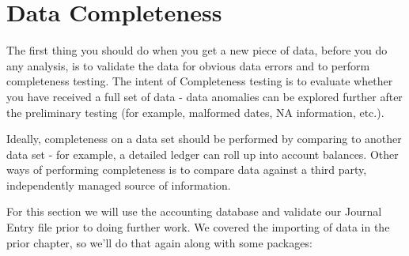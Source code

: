 \documentclass[
]{book}
\newenvironment{Shaded}{\begin{snugshade}}{\end{snugshade}}
\newcommand{\CommentTok}[1]{\textcolor[rgb]{0.56,0.35,0.01}{\textit{#1}}}
\newcommand{\DataTypeTok}[1]{\textcolor[rgb]{0.13,0.29,0.53}{#1}}
\newcommand{\KeywordTok}[1]{\textcolor[rgb]{0.13,0.29,0.53}{\textbf{#1}}}
\newcommand{\NormalTok}[1]{#1}
\newcommand{\OperatorTok}[1]{\textcolor[rgb]{0.81,0.36,0.00}{\textbf{#1}}}
\newcommand{\OtherTok}[1]{\textcolor[rgb]{0.56,0.35,0.01}{#1}}
\newcommand{\StringTok}[1]{\textcolor[rgb]{0.31,0.60,0.02}{#1}}
\begin{document}
\hypertarget{data-completeness}{%
\chapter{Data Completeness}\label{data-completeness}}

The first thing you should do when you get a new piece of data, before you do any analysis, is to validate the data for obvious data errors and to perform completeness testing. The intent of Completeness testing is to evaluate whether you have received a full set of data - data anomalies can be explored further after the preliminary testing (for example, malformed dates, NA information, etc.).

Ideally, completeness on a data set should be performed by comparing to another data set - for example, a detailed ledger can roll up into account balances. Other ways of performing completeness is to compare data against a third party, independently managed source of information.

For this section we will use the accounting database and validate our Journal Entry file prior to doing further work. We covered the importing of data in the prior chapter, so we'll do that again along with some packages:

\begin{Shaded}
\end{Shaded}
\end{document}
